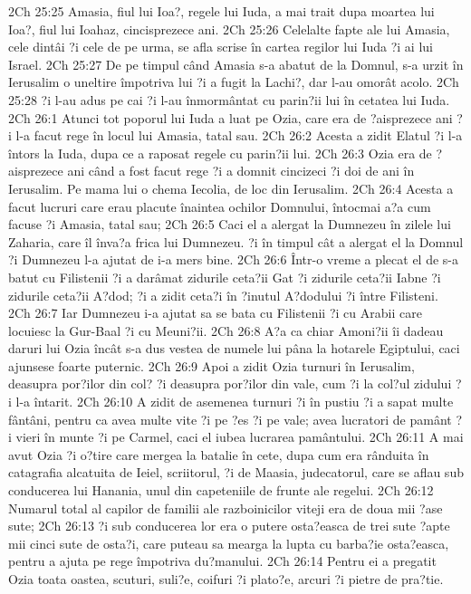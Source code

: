 2Ch 25:25  Amasia, fiul lui Ioa?, regele lui Iuda, a mai trait dupa moartea lui Ioa?, fiul lui Ioahaz, cincisprezece ani.
2Ch 25:26  Celelalte fapte ale lui Amasia, cele dintâi ?i cele de pe urma, se afla scrise în cartea regilor lui Iuda ?i ai lui Israel.
2Ch 25:27  De pe timpul când Amasia s-a abatut de la Domnul, s-a urzit în Ierusalim o uneltire împotriva lui ?i a fugit la Lachi?, dar l-au omorât acolo.
2Ch 25:28  ?i l-au adus pe cai ?i l-au înmormântat cu parin?ii lui în cetatea lui Iuda.
2Ch 26:1  Atunci tot poporul lui Iuda a luat pe Ozia, care era de ?aisprezece ani ?i l-a facut rege în locul lui Amasia, tatal sau.
2Ch 26:2  Acesta a zidit Elatul ?i l-a întors la Iuda, dupa ce a raposat regele cu parin?ii lui.
2Ch 26:3  Ozia era de ?aisprezece ani când a fost facut rege ?i a domnit cincizeci ?i doi de ani în Ierusalim. Pe mama lui o chema Iecolia, de loc din Ierusalim.
2Ch 26:4  Acesta a facut lucruri care erau placute înaintea ochilor Domnului, întocmai a?a cum facuse ?i Amasia, tatal sau;
2Ch 26:5  Caci el a alergat la Dumnezeu în zilele lui Zaharia, care îl înva?a frica lui Dumnezeu. ?i în timpul cât a alergat el la Domnul ?i Dumnezeu l-a ajutat de i-a mers bine.
2Ch 26:6  Într-o vreme a plecat el de s-a batut cu Filistenii ?i a darâmat zidurile ceta?ii Gat ?i zidurile ceta?ii Iabne ?i zidurile ceta?ii A?dod; ?i a zidit ceta?i în ?inutul A?dodului ?i între Filisteni.
2Ch 26:7  Iar Dumnezeu i-a ajutat sa se bata cu Filistenii ?i cu Arabii care locuiesc la Gur-Baal ?i cu Meuni?ii.
2Ch 26:8  A?a ca chiar Amoni?ii îi dadeau daruri lui Ozia încât s-a dus vestea de numele lui pâna la hotarele Egiptului, caci ajunsese foarte puternic.
2Ch 26:9  Apoi a zidit Ozia turnuri în Ierusalim, deasupra por?ilor din col? ?i deasupra por?ilor din vale, cum ?i la col?ul zidului ?i l-a întarit.
2Ch 26:10  A zidit de asemenea turnuri ?i în pustiu ?i a sapat multe fântâni, pentru ca avea multe vite ?i pe ?es ?i pe vale; avea lucratori de pamânt ?i vieri în munte ?i pe Carmel, caci el iubea lucrarea pamântului.
2Ch 26:11  A mai avut Ozia ?i o?tire care mergea la batalie în cete, dupa cum era rânduita în catagrafia alcatuita de Ieiel, scriitorul, ?i de Maasia, judecatorul, care se aflau sub conducerea lui Hanania, unul din capeteniile de frunte ale regelui.
2Ch 26:12  Numarul total al capilor de familii ale razboinicilor viteji era de doua mii ?ase sute;
2Ch 26:13  ?i sub conducerea lor era o putere osta?easca de trei sute ?apte mii cinci sute de osta?i, care puteau sa mearga la lupta cu barba?ie osta?easca, pentru a ajuta pe rege împotriva du?manului.
2Ch 26:14  Pentru ei a pregatit Ozia toata oastea, scuturi, suli?e, coifuri ?i plato?e, arcuri ?i pietre de pra?tie.
